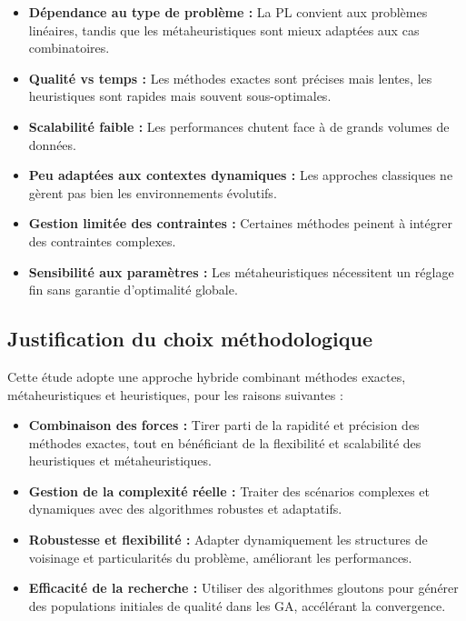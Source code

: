 \begin{itemize}
	\item \textbf{Dépendance au type de problème :} La \ac{PL} convient aux problèmes linéaires, tandis que les métaheuristiques sont mieux adaptées aux cas combinatoires.
	
	\item \textbf{Qualité vs temps :} Les méthodes exactes sont précises mais lentes, les heuristiques sont rapides mais souvent sous-optimales.
	
	\item \textbf{Scalabilité faible :} Les performances chutent face à de grands volumes de données.
	
	\item \textbf{Peu adaptées aux contextes dynamiques :} Les approches classiques ne gèrent pas bien les environnements évolutifs.
	
	\item \textbf{Gestion limitée des contraintes :} Certaines méthodes peinent à intégrer des contraintes complexes.
	
	\item \textbf{Sensibilité aux paramètres :} Les métaheuristiques nécessitent un réglage fin sans garantie d’optimalité globale.
\end{itemize}
\vspace{-1em}
\subsection{Justification du choix méthodologique}

Cette étude adopte une approche hybride combinant méthodes exactes, métaheuristiques et heuristiques, pour les raisons suivantes :

\begin{itemize}
	\item \textbf{Combinaison des forces :} Tirer parti de la rapidité et précision des méthodes exactes, tout en bénéficiant de la flexibilité et scalabilité des heuristiques et métaheuristiques.
	
	\item \textbf{Gestion de la complexité réelle :} Traiter des scénarios complexes et dynamiques avec des algorithmes robustes et adaptatifs.
	
	\item \textbf{Robustesse et flexibilité :} Adapter dynamiquement les structures de voisinage et particularités du problème, améliorant les performances.
	
	\item \textbf{Efficacité de la recherche :} Utiliser des algorithmes gloutons pour générer des populations initiales de qualité dans les \ac{GA}, accélérant la convergence.
\end{itemize}
\vspace{-1.2em}
